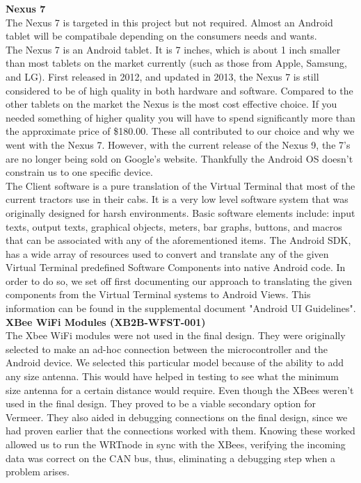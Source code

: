 \documentclass[paper=a4, fontsize=11pt]{scrartcl}
\numberwithin{equation}{section}		%
\numberwithin{figure}{section}			%
\numberwithin{table}{section}				%
\begin{document}
\textbf{Nexus 7} \\
The Nexus 7 is targeted in this project but not required. Almost an Android tablet will be compatibale depending on the consumers needs and wants. \\

The Nexus 7 is an Android tablet. It is 7 inches, which is about 1 inch smaller than most tablets on the market currently (such as those from Apple, Samsung, and LG). First released in 2012, and updated in 2013, the Nexus 7 is still considered to be of high quality in both hardware and software. Compared to the other tablets on the market the Nexus is the most cost effective choice. If you needed something of higher quality you will have to spend significantly more than the approximate price of \$180.00. These all contributed to our choice and why we went with the Nexus 7. However, with the current release of the Nexus 9, the 7's are no longer being sold on Google's website. Thankfully the Android OS doesn't constrain us to one specific device. \\

The Client software is a pure translation of the Virtual Terminal that most of the current tractors use in their cabs. It is a very low level software system that was originally designed for harsh environments. Basic software elements include: input texts, output texts, graphical objects, meters, bar graphs, buttons, and macros that can be associated with any of the aforementioned items. The Android SDK, has a wide array of resources used to convert and translate any of the given Virtual Terminal predefined Software Components into native Android code. In order to do so, we set off first documenting our approach to translating the given components from the Virtual Terminal systems to Android Views. This information can be found in the supplemental document "Android UI Guidelines".  \\

\textbf{XBee WiFi Modules (XB2B-WFST-001)} \\
The Xbee WiFi modules were not used in the final design. They were originally selected to make an ad-hoc connection between the microcontroller and the Android device. We selected this particular model because of the ability to add any size antenna. This would have helped in testing to see what the minimum size antenna for a certain distance would require. Even though the XBees weren't used in the final design. They proved to be a viable secondary option for Vermeer. They also aided in debugging connections on the final design, since we had proven earlier that the connections worked with them. Knowing these worked allowed us to run the WRTnode in sync with the XBees, verifying the incoming data was correct on the CAN bus, thus, eliminating a debugging step when a problem arises. \\
\end{document}
